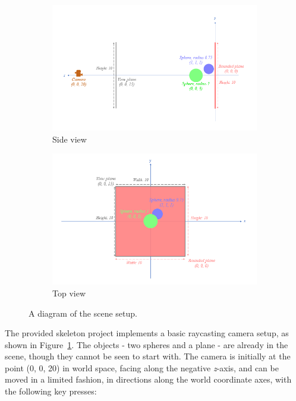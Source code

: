 \documentclass{../../../fal_assignment}
\begin{document}
\begin{figure}[ht]
	\begin{center}
		\begin{subfigure}[b]{0.45\linewidth}
			\includegraphics[width=\linewidth]{scene_side}
			\caption{Side view}
		\end{subfigure}
		\begin{subfigure}[b]{0.45\linewidth}
			\includegraphics[width=\linewidth]{scene_top}
			\caption{Top view}
		\end{subfigure}
	\end{center}
	\caption{A diagram of the scene setup.}
	\label{fig:scene}
\end{figure}

The provided skeleton project implements a basic raycasting camera setup, as shown in Figure~\ref{fig:scene}.
The objects - two spheres and a plane - are already in the scene, though they cannot be seen to start with. The camera is initially at the point (0, 0, 20) in world space, facing along the negative \textit{z}-axis, and can be moved in a limited fashion, in directions along the world coordinate axes, with the following key presses:
\end{document}
